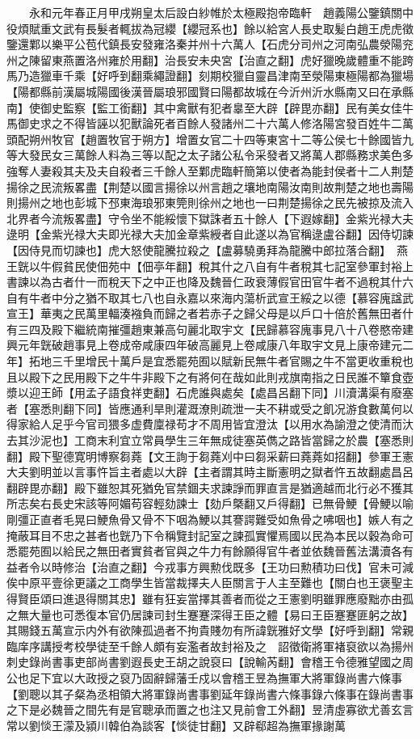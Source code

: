 　　永和元年春正月甲戌朔皇太后設白紗帷於太極殿抱帝臨軒　趙義陽公鑒鎮關中役煩賦重文武有長髮者輒拔為冠纓【纓冠系也】餘以給宮人長史取髪白趙王虎虎徵鑒還鄴以樂平公苞代鎮長安發雍洛秦并州十六萬人【石虎分司州之河南弘農滎陽兖州之陳留東燕置洛州雍於用翻】治長安未央宮【治直之翻】虎好獵晚歲體重不能跨馬乃造獵車千乘【好呼到翻乘繩證翻】刻期校獵自靈昌津南至滎陽東極陽都為獵場【陽都縣前漢屬城陽國後漢晉屬琅邪國賢曰陽都故城在今沂州沂水縣南又曰在承縣南】使御史監察【監工銜翻】其中禽獸有犯者辠至大辟【辟毘亦翻】民有美女佳牛馬御史求之不得皆誣以犯獸論死者百餘人發諸州二十六萬人修洛陽宮發百姓牛二萬頭配朔州牧官【趙置牧官于朔方】增置女官二十四等東宮十二等公侯七十餘國皆九等大發民女三萬餘人料為三等以配之太子諸公私令采發者又將萬人郡縣務求美色多強奪人妻殺其夫及夫自殺者三千餘人至鄴虎臨軒簡第以使者為能封侯者十二人荆楚揚徐之民流叛畧盡【荆楚以國言揚徐以州言趙之壤地南陽汝南則故荆楚之地也壽陽則揚州之地也彭城下邳東海琅邪東筦則徐州之地也一曰荆楚揚徐之民先被掠及流入北界者今流叛畧盡】守令坐不能綏懷下獄誅者五十餘人【下遐嫁翻】金紫光禄大夫逯明【金紫光禄大夫即光禄大夫加金章紫綬者自此遂以為官稱逯盧谷翻】因侍切諫【因侍見而切諫也】虎大怒使龍騰拉殺之【盧募驍勇拜為龍騰中郎拉落合翻】　燕王皝以牛假貧民使佃苑中【佃亭年翻】稅其什之八自有牛者稅其七記室參軍封裕上書諫以為古者什一而稅天下之中正也降及魏晉仁政衰薄假官田官牛者不過稅其什六自有牛者中分之猶不取其七八也自永嘉以來海内蕩析武宣王綏之以德【慕容廆諡武宣王】華夷之民萬里輻湊襁負而歸之者若赤子之歸父母是以戶口十倍於舊無田者什有三四及殿下繼統南摧彊趙東兼高句麗北取宇文【民歸慕容廆事見八十八卷愍帝建興元年皝破趙事見上卷成帝咸康四年破高麗見上卷咸康八年取宇文見上康帝建元二年】拓地三千里增民十萬戶是宜悉罷苑囿以賦新民無牛者官賜之牛不當更收重稅也且以殿下之民用殿下之牛牛非殿下之有將何在哉如此則戎旗南指之日民誰不簞食壺漿以迎王師【用孟子語食祥吏翻】石虎誰與處矣【處昌呂翻下同】川瀆溝渠有廢塞者【塞悉則翻下同】皆應通利旱則灌溉潦則疏泄一夫不耕或受之飢况游食數萬何以得家給人足乎今官司猥多虚費廩禄苟才不周用皆宜澄汰【以用水為諭澄之使清而汏去其沙泥也】工商末利宜立常員學生三年無成徒塞英儁之路皆當歸之於農【塞悉則翻】殿下聖德寛明博察芻蕘【文王詢于芻蕘刈中曰芻采薪曰蕘蕘如招翻】參軍王憲大夫劉明並以言事忤旨主者處以大辟【主者謂其時主斷憲明之獄者忤五故翻處昌呂翻辟毘亦翻】殿下雖恕其死猶免官禁錮夫求諫諍而罪直言是猶適越而北行必不獲其所志矣右長史宋該等阿媚苟容輕劾諫士【劾戶槩翻又戶得翻】已無骨鯁【骨鯁以喻剛彊正直者毛晃曰鯁魚骨又骨不下咽為鯁以其謇諤難受如魚骨之咈咽也】嫉人有之掩蔽耳目不忠之甚者也皝乃下令稱覽封記室之諫孤實懼焉國以民為本民以穀為命可悉罷苑囿以給民之無田者實貧者官與之牛力有餘願得官牛者並依魏晉舊法溝瀆各有益者令以時修治【治直之翻】今戎事方興勲伐既多【王功曰勲積功曰伐】官未可減俟中原平壹徐更議之工商學生皆當裁擇夫人臣關言于人主至難也【關白也王褒聖主得賢臣頌曰進退得關其忠】雖有狂妄當擇其善者而從之王憲劉明雖罪應廢黜亦由孤之無大量也可悉復本官仍居諫司封生蹇蹇深得王臣之體【易曰王臣蹇蹇匪躬之故】其賜錢五萬宣示内外有欲陳孤過者不拘貴賤勿有所諱皝雅好文學【好呼到翻】常親臨庠序講授考校學徒至千餘人頗有妄濫者故封裕及之　詔徵衛將軍褚裒欲以為揚州刺史錄尚書事吏部尚書劉遐長史王胡之說裒曰【說輸芮翻】會稽王令德雅望國之周公也足下宜以大政授之裒乃固辭歸藩壬戍以會稽王昱為撫軍大將軍錄尚書六條事【劉聰以其子粲為丞相領大將軍錄尚書事劉延年錄尚書六條事錄六條事在錄尚書事之下是必魏晉之間先有是官聰承而置之也注又見前會工外翻】昱清虛寡欲尤善玄言常以劉惔王濛及潁川韓伯為談客【惔徒甘翻】又辟郗超為撫軍掾謝萬